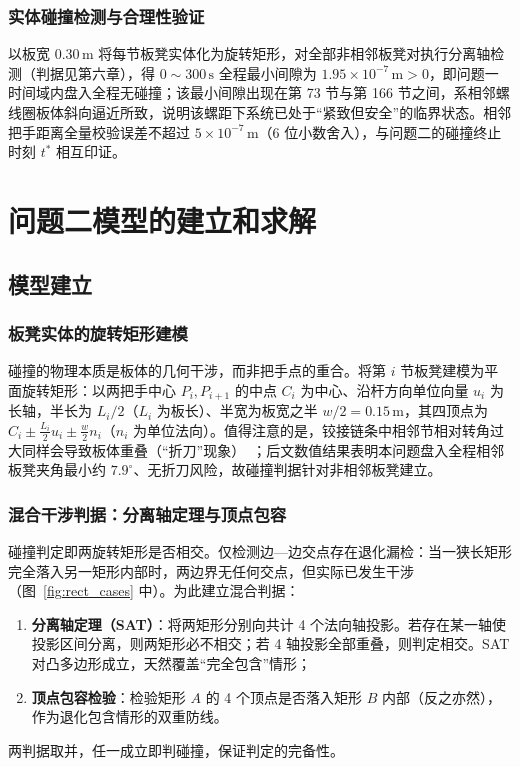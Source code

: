 ﻿\documentclass{cumcmthesis}
\begin{document}
\subsubsection{实体碰撞检测与合理性验证}
以板宽 $0.30\,\text{m}$ 将每节板凳实体化为旋转矩形，对全部非相邻板凳对执行分离轴检测（判据见第六章），得 $0\sim300\,\text{s}$ 全程最小间隙为 $1.95\times10^{-7}\,\text{m}>0$，即问题一时间域内盘入全程无碰撞；该最小间隙出现在第 73 节与第 166 节之间，系相邻螺线圈板体斜向逼近所致，说明该螺距下系统已处于“紧致但安全”的临界状态。相邻把手距离全量校验误差不超过 $5\times10^{-7}\,\text{m}$（6 位小数舍入），与问题二的碰撞终止时刻 $t^{*}$ 相互印证。

\section{问题二模型的建立和求解}

\subsection{模型建立}

\subsubsection{板凳实体的旋转矩形建模}
碰撞的物理本质是板体的几何干涉，而非把手点的重合。将第 $i$ 节板凳建模为平面旋转矩形：以两把手中心 $P_i,P_{i+1}$ 的中点 $C_i$ 为中心、沿杆方向单位向量 $u_i$ 为长轴，半长为 $L_i/2$（$L_i$ 为板长）、半宽为板宽之半 $w/2=0.15\,\text{m}$，其四顶点为 $C_i\pm \frac{L_i}{2}u_i\pm\frac{w}{2}n_i$（$n_i$ 为单位法向）。值得注意的是，铰接链条中相邻节相对转角过大同样会导致板体重叠（“折刀”现象）~\cite{tanaka}；后文数值结果表明本问题盘入全程相邻板凳夹角最小约 $7.9^\circ$、无折刀风险，故碰撞判据针对非相邻板凳建立。

\subsubsection{混合干涉判据：分离轴定理与顶点包容}
碰撞判定即两旋转矩形是否相交。仅检测边—边交点存在退化漏检：当一狭长矩形完全落入另一矩形内部时，两边界无任何交点，但实际已发生干涉（图~\ref{fig:rect_cases} 中）。为此建立混合判据：
\begin{enumerate}
    \item \textbf{分离轴定理（SAT）}：将两矩形分别向共计 4 个法向轴投影。若存在某一轴使投影区间分离，则两矩形必不相交；若 4 轴投影全部重叠，则判定相交。SAT 对凸多边形成立，天然覆盖“完全包含”情形；
    \item \textbf{顶点包容检验}：检验矩形 $A$ 的 4 个顶点是否落入矩形 $B$ 内部（反之亦然），作为退化包含情形的双重防线。
\end{enumerate}
两判据取并，任一成立即判碰撞，保证判定的完备性。
\end{document}
